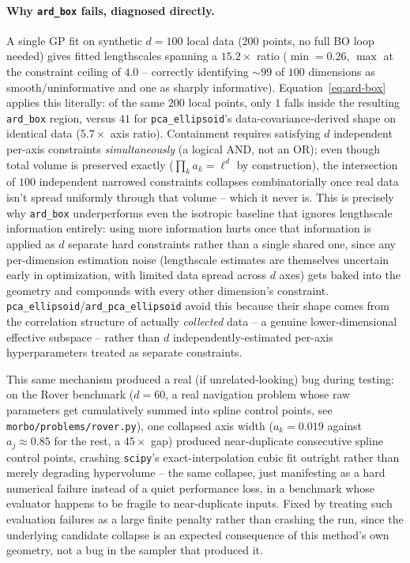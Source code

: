\documentclass[11pt]{article}
\begin{document}
\paragraph{Why \texttt{ard\_box} fails, diagnosed directly.} A single GP
fit on synthetic $d=100$ local data (200 points, no full BO loop needed)
gives fitted lengthscales spanning a $15.2\times$ ratio ($\min=0.26$,
$\max$ at the constraint ceiling of $4.0$ -- correctly identifying $\sim
99$ of $100$ dimensions as smooth/uninformative and one as sharply
informative). Equation~\ref{eq:ard-box} applies this literally: of the same
$200$ local points, only \textbf{$1$} falls inside the resulting
\texttt{ard\_box} region, versus \textbf{$41$} for \texttt{pca\_ellipsoid}'s
data-covariance-derived shape on identical data ($5.7\times$ axis ratio).
Containment requires satisfying $d$ independent per-axis constraints
\emph{simultaneously} (a logical AND, not an OR); even though total volume
is preserved exactly ($\prod_k a_k = \ell^d$ by construction), the
intersection of $100$ independent narrowed constraints collapses
combinatorially once real data isn't spread uniformly through that volume
-- which it never is. This is precisely why \texttt{ard\_box} underperforms
even the isotropic baseline that ignores lengthscale information entirely:
using more information hurts once that information is applied as $d$
separate hard constraints rather than a single shared one, since any
per-dimension estimation noise (lengthscale estimates are themselves
uncertain early in optimization, with limited data spread across $d$ axes)
gets baked into the geometry and compounds with every other dimension's
constraint. \texttt{pca\_ellipsoid}/\texttt{ard\_pca\_ellipsoid} avoid this
because their shape comes from the correlation structure of actually
\emph{collected} data -- a genuine lower-dimensional effective subspace --
rather than $d$ independently-estimated per-axis hyperparameters treated as
separate constraints.

This same mechanism produced a real (if unrelated-looking) bug during
testing: on the Rover benchmark ($d=60$, a real navigation problem whose
raw parameters get cumulatively summed into spline control points, see
\texttt{morbo/problems/rover.py}), one collapsed axis width
($a_k = 0.019$ against $a_j \approx 0.85$ for the rest, a $45\times$ gap)
produced near-duplicate consecutive spline control points, crashing
\texttt{scipy}'s exact-interpolation cubic fit outright rather than merely
degrading hypervolume -- the same collapse, just manifesting as a hard
numerical failure instead of a quiet performance loss, in a benchmark whose
evaluator happens to be fragile to near-duplicate inputs. Fixed by treating
such evaluation failures as a large finite penalty rather than crashing the
run, since the underlying candidate collapse is an expected consequence of
this method's own geometry, not a bug in the sampler that produced it.
\end{document}
